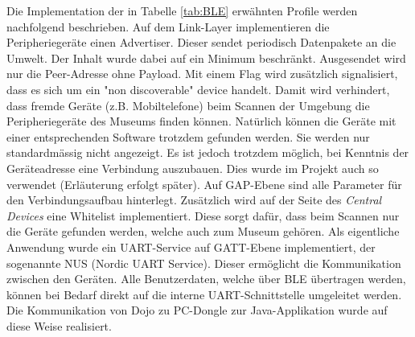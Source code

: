 Die Implementation der in Tabelle \ref{tab:BLE} erwähnten Profile werden nachfolgend beschrieben. 
Auf dem Link-Layer implementieren die Peripheriegeräte einen Advertiser. Dieser sendet periodisch Datenpakete an die Umwelt. Der Inhalt wurde dabei auf ein Minimum beschränkt. Ausgesendet wird nur die Peer-Adresse ohne Payload. Mit einem Flag wird zusätzlich signalisiert, 
dass es sich um ein "non discoverable" device handelt. 
Damit wird verhindert, dass fremde Geräte (z.B. Mobiltelefone) beim Scannen der Umgebung die Peripheriegeräte des Museums 
finden können. 
Natürlich können die Geräte mit einer entsprechenden Software trotzdem gefunden werden. Sie werden nur standardmässig nicht angezeigt.
Es ist jedoch trotzdem möglich, bei Kenntnis der Geräteadresse eine Verbindung auszubauen. Dies wurde im Projekt auch so verwendet (Erläuterung erfolgt später).
Auf GAP-Ebene sind alle Parameter für den Verbindungsaufbau hinterlegt. Zusätzlich wird auf der Seite des \textit{Central Devices} eine Whitelist implementiert. Diese sorgt dafür, dass beim Scannen nur die Geräte gefunden werden, welche auch zum Museum gehören.
Als eigentliche Anwendung wurde ein UART-Service auf GATT-Ebene implementiert, der sogenannte NUS (Nordic UART Service). Dieser ermöglicht die Kommunikation zwischen den Geräten. Alle Benutzerdaten, welche über BLE übertragen werden, können bei Bedarf direkt auf die interne UART-Schnittstelle umgeleitet werden. Die Kommunikation von Dojo zu PC-Dongle zur Java-Applikation wurde auf diese Weise realisiert.

